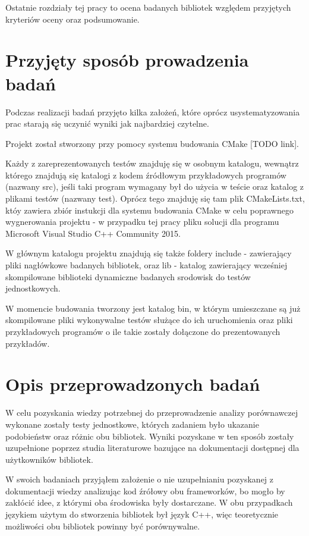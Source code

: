 \documentclass[12pt,a4paper,notitlepage]{report}
\begin{document}
Ostatnie rozdziały tej pracy to ocena badanych bibliotek względem przyjętych kryteriów oceny oraz podsumowanie.

\chapter{Przyjęty sposób prowadzenia badań}

Podczas realizacji badań przyjęto kilka założeń, które oprócz usystematyzowania prac starają się uczynić wyniki jak najbardziej czytelne.

Projekt został stworzony przy pomocy systemu budowania CMake [TODO link].

Każdy z zareprezentowanych testów znajduję się w osobnym katalogu, wewnątrz którego znajdują się katalogi z kodem źródłowym przykładowych programów (nazwany src), jeśli taki program wymagany był do użycia w teście oraz katalog z plikami testów (nazwany test). Oprócz tego znajduję się tam plik CMakeLists.txt, któy zawiera zbiór instukcji dla systemu budowania CMake w celu poprawnego wygnerowania projektu - w przypadku tej pracy pliku solucji dla programu Microsoft Visual Studio C++ Community 2015.

W głównym katalogu projektu znajdują się także foldery include - zawierający pliki nagłówkowe badanych bibliotek, oraz lib - katalog zawierający wcześniej skompilowane biblioteki dynamiczne badanych srodowisk do testów jednostkowych.

W momencie budowania tworzony jest katalog bin, w którym umieszczane są już skompilowane pliki wykonywalne testów służące do ich uruchomienia oraz pliki przykładowych programów o ile takie zostały dołączone do prezentowanych przykładów.


\chapter{Opis przeprowadzonych badań}

W celu pozyskania wiedzy potrzebnej do przeprowadzenie analizy porównawczej wykonane zostały testy jednostkowe, których zadaniem było ukazanie podobieństw oraz różnic obu bibliotek. Wyniki pozyskane w ten sposób zostały uzupełnione poprzez studia literaturowe bazujące na dokumentacji dostępnej dla użytkowników bibliotek.

W swoich badaniach przyjąłem założenie o nie uzupełnianiu pozyskanej z dokumentacji wiedzy analizując kod źrółowy obu frameworków, bo mogło by zakłócić idee, z którymi oba środowiska były dostarczane. W obu przypadkach językiem użytym do stworzenia bibliotek był język C++, więc teoretycznie możliwości obu bibliotek powinny być porównywalne.
\end{document}
